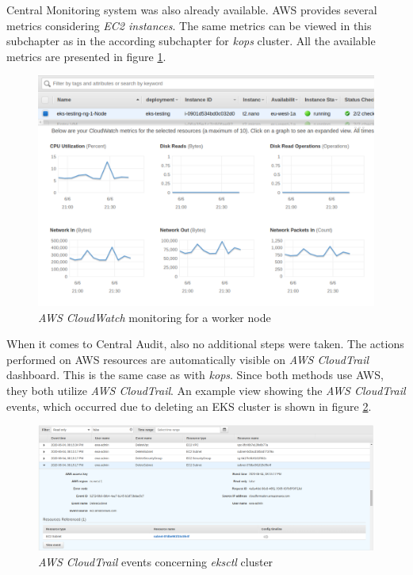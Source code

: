 Central Monitoring system was also already available. AWS provides several metrics considering \textit{EC2 instances}. The same metrics can be viewed in this subchapter as in the according subchapter for \textit{kops} cluster. All the available metrics are presented in figure \ref{eks-monitoring-ec2-node}.
\begin{figure}[H]
    \centering
    \includegraphics[width=17cm]{figures/eks-monitoring-ec2-node-small.png}
    \captionsetup{justification=centering,margin=2cm}
    \caption{\textit{AWS CloudWatch} monitoring for a worker node}
    \label{eks-monitoring-ec2-node}
\end{figure}

When it comes to Central Audit, also no additional steps were taken. The actions performed on AWS resources are automatically visible on \textit{AWS CloudTrail} dashboard. This is the same case as with \textit{kops}. Since both methods use AWS, they both utilize \textit{AWS CloudTrail}. An example view showing the \textit{AWS CloudTrail} events, which occurred due to deleting an EKS cluster is shown in figure \ref{fig:eks-ct-events}.
\begin{figure}[H]
    \centering
    \includegraphics[width=17cm]{figures/eks-ct.png}
    \captionsetup{justification=centering,margin=2cm}
    \caption{\textit{AWS CloudTrail} events concerning \textit{eksctl} cluster}
    \label{fig:eks-ct-events}
\end{figure}

